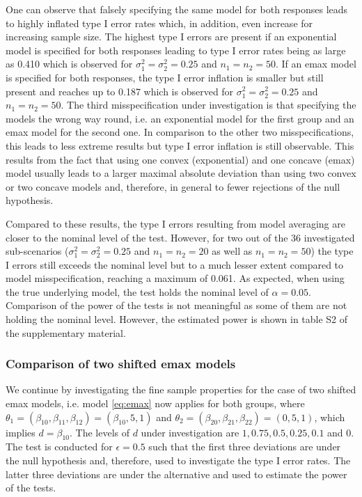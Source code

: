 {One can observe that falsely specifying the same model for both responses leads to highly inflated type I error rates which, in addition, even increase for increasing sample size.
The highest type I errors are present if an exponential model is specified for both responses leading to type I error rates being as large as 0.410 which is observed for $\sigma_1^2  = \sigma_2^2 = 0.25$ and $n_1 = n_2 = 50$. 
If an emax model is specified for both responses, the type I error inflation is smaller but still present and reaches up to 0.187 which is observed for $\sigma_1^2  = \sigma_2^2 = 0.25$ and $n_1 = n_2 = 50$.
The third misspecification under investigation is that specifying the models the wrong way round, i.e. an exponential model for the first group and an emax model for the second one. In comparison to the other two misspecifications, this leads to less extreme results but type I error inflation is still observable. This results from the fact that using one convex (exponential) and one concave (emax) model usually leads to a larger  maximal absolute deviation than using two convex or two concave models and, therefore, in general to fewer rejections of the null hypothesis.

Compared to these results, the type I errors resulting from model averaging are closer to the nominal level of the test. However, for two out of the 36 investigated sub-scenarios ($\sigma_1^2  = \sigma_2^2 = 0.25$ and $n_1 = n_2 = 20$ as well as $n_1 = n_2 = 50$) the type I errors still exceeds the nominal level but to a much lesser extent compared to model misspecification, reaching a maximum of 0.061. As expected, when using the true underlying model, the test holds the nominal level of $\alpha = 0.05$.
Comparison of the power of the tests is not meaningful as some of them are not holding the nominal level. However, the estimated power is shown in table S2 of the supplementary material.  
\subsubsection{Comparison of two shifted emax models} \label{sec:simu:MA:2}
We continue by investigating the fine sample properties for the case of two shifted emax models, i.e. model \ref{eq:emax} now applies for both groups, where $\theta_1 = (\beta_{10}, \beta_{11}, \beta_{12}) = (\beta_{10}, 5, 1)$ and $\theta_2 = (\beta_{20}, \beta_{21}, \beta_{22}) = (0, 5, 1)$, which implies $d = \beta_{10}$. The levels of $d$ under investigation are $1, 0.75, 0.5, 0.25, 0.1$ and $0$. The test is conducted for $\epsilon = 0.5$ such that the first three deviations are under the null hypothesis and, therefore, used to investigate the type I error rates. 
The latter three deviations are under the alternative and used to estimate the power of the tests.  

}
